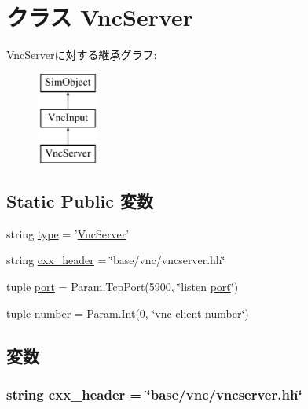 \hypertarget{classVnc_1_1VncServer}{
\section{クラス VncServer}
\label{classVnc_1_1VncServer}
}
VncServerに対する継承グラフ:\begin{figure}[H]
\begin{center}
\leavevmode
\includegraphics[height=3cm]{classVnc_1_1VncServer}
\end{center}
\end{figure}
\subsection*{Static Public 変数}
\begin{DoxyCompactItemize}
\item 
string \hyperlink{classVnc_1_1VncServer_acce15679d830831b0bbe8ebc2a60b2ca}{type} = '\hyperlink{classVnc_1_1VncServer}{VncServer}'
\item 
string \hyperlink{classVnc_1_1VncServer_a17da7064bc5c518791f0c891eff05fda}{cxx\_\-header} = \char`\"{}base/vnc/vncserver.hh\char`\"{}
\item 
tuple \hyperlink{classVnc_1_1VncServer_a1aadf525515ecfcf662c2aa51a503763}{port} = Param.TcpPort(5900, \char`\"{}listen \hyperlink{classVnc_1_1VncServer_a1aadf525515ecfcf662c2aa51a503763}{port}\char`\"{})
\item 
tuple \hyperlink{classVnc_1_1VncServer_a629b7ca94b6a486bdc504ed959b90cc8}{number} = Param.Int(0, \char`\"{}vnc client \hyperlink{classVnc_1_1VncServer_a629b7ca94b6a486bdc504ed959b90cc8}{number}\char`\"{})
\end{DoxyCompactItemize}


\subsection{変数}
\hypertarget{classVnc_1_1VncServer_a17da7064bc5c518791f0c891eff05fda}{
\subsubsection[{cxx\_\-header}]{\setlength{\rightskip}{0pt plus 5cm}string {\bf cxx\_\-header} = \char`\"{}base/vnc/vncserver.hh\char`\"{}}}
\label{classVnc_1_1VncServer_a17da7064bc5c518791f0c891eff05fda}


